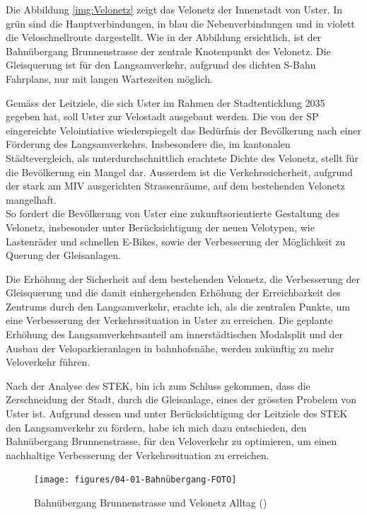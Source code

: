 Die Abbildung \ref{img:Velonetz} zeigt das Velonetz der Innenstadt von Uster. In grün sind die Hauptverbindungen, in blau die Nebenverbindungen und in violett die Veloschnellroute dargestellt. Wie in der Abbildung ersichtlich, ist der Bahnübergang Brunnenstrasse der zentrale Knotenpunkt des Velonetz. Die Gleisquerung ist für den Langsamverkehr, aufgrund des dichten S-Bahn Fahrplans, nur mit langen Wartezeiten möglich. 

Gemäss der Leitziele, die sich Uster im Rahmen der Stadtenticklung 2035 gegeben hat, soll Uster zur Velostadt ausgebaut werden. Die von der SP eingereichte Velointiative wiederspiegelt das Bedürfnis der Bevölkerung nach einer Förderung des Langsamverkehrs. Insbesondere die, im kantonalen Städtevergleich, als unterdurchschnittlich erachtete Dichte des Velonetz, stellt für die Bevölkerung ein Mangel dar. Ausserdem ist die Verkehrssicherheit, aufgrund der stark am MIV ausgerichten Strassenräume, auf dem bestehenden Velonetz mangelhaft. \\
So fordert die Bevölkerung von Uster eine zukunftsorientierte Gestaltung des Velonetz, insbesonder unter Berücksichtigung der neuen Velotypen, wie Lastenräder und schnellen E-Bikes, sowie der Verbesserung der Möglichkeit zu Querung der Gleisanlagen. 

Die Erhöhung der Sicherheit auf dem bestehenden Velonetz, die Verbesserung der Gleisquerung und die damit einhergehenden Erhöhung der Erreichbarkeit des Zentrums durch den Langsamverkehr, erachte ich, als die zentralen Punkte, um eine Verbesserung der Verkehrssituation in Uster zu erreichen. Die geplante Erhöhung des Langsamverkehrsanteil am innerstädtischen Modalsplit und der Ausbau der Veloparkieranlagen in bahnhofsnähe, werden zukünftig zu mehr Veloverkehr führen. 

Nach der Analyse des STEK, bin ich zum Schluss gekommen, dass die Zerschneidung der Stadt, durch die Gleisanlage, eines der grössten Probelem von Uster ist. Aufgrund dessen und unter Berücksichtigung der Leitziele des STEK den Langsamverkehr zu fördern, habe ich mich dazu entschieden, den Bahnübergang Brunnenstrasse, für den Veloverkehr zu optimieren, um einen nachhaltige Verbesserung der Verkehrssituation zu erreichen. 

\begin{figure}[h!]
	\centering
	\texttt{[image: figures/04-01-Bahnübergang-FOTO]}
	\caption[Bahnübergang Brunnenstrasse]{Bahnübergang Brunnenstrasse und Velonetz Alltag (\cite{GIS})}
	\label{img:Brunnenstrasse}
\end{figure}

